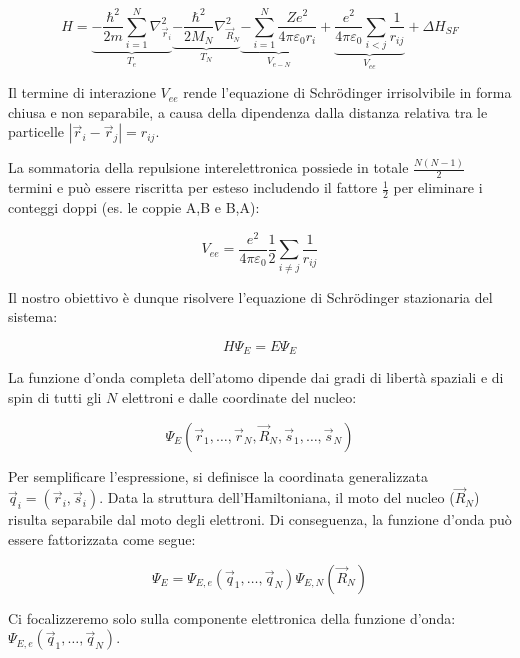 \begin{equation}
    H = \underbrace{-\frac{\hbar^2}{2m} \sum_{i=1}^{N} \nabla_{\vec{r}_i}^2}_{T_e} \underbrace{-\frac{\hbar^2}{2M_N} \nabla_{\vec{R}_N}^2}_{T_N} \underbrace{- \sum_{i=1}^{N} \frac{Z e^2}{4\pi\varepsilon_0 r_i}}_{V_{e-N}} + \underbrace{\frac{e^2}{4\pi\varepsilon_0} \sum_{i < j} \frac{1}{r_{ij}}}_{V_{ee}} + \Delta H_{SF}
\end{equation}

Il termine di interazione \( V_{ee} \) rende l'equazione di Schrödinger irrisolvibile in forma chiusa e non separabile, a causa della dipendenza dalla distanza relativa tra le particelle \( |\vec{r}_i - \vec{r}_j| = r_{ij} \). 

La sommatoria della repulsione interelettronica possiede in totale \( \frac{N(N-1)}{2} \) termini e può essere riscritta per esteso includendo il fattore \( \frac{1}{2} \) per eliminare i conteggi doppi (es. le coppie A,B e B,A):

\begin{equation}
    V_{ee} = \frac{e^2}{4\pi\varepsilon_0} \frac{1}{2} \sum_{i \neq j} \frac{1}{r_{ij}}
\end{equation}

Il nostro obiettivo è dunque risolvere l'equazione di Schrödinger stazionaria del sistema:

\begin{equation}
    H \Psi_E = E \Psi_E
\end{equation}

La funzione d'onda completa dell'atomo dipende dai gradi di libertà spaziali e di spin di tutti gli \( N \) elettroni e dalle coordinate del nucleo:

\begin{equation}
    \Psi_E(\vec{r}_1, \dots, \vec{r}_N, \vec{R}_N, \vec{s}_1, \dots, \vec{s}_N)
\end{equation}

Per semplificare l'espressione, si definisce la coordinata generalizzata \( \vec{q}_i = (\vec{r}_i, \vec{s}_i) \). Data la struttura dell'Hamiltoniana, il moto del nucleo (\( \vec{R}_N \)) risulta separabile dal moto degli elettroni. Di conseguenza, la funzione d'onda può essere fattorizzata come segue:

\begin{equation}
    \Psi_E = \Psi_{E,e}(\vec{q}_1, \dots, \vec{q}_N)\Psi_{E,N}(\vec{R}_N)
\end{equation}

Ci focalizzeremo solo sulla componente elettronica della funzione d'onda: \( \Psi_{E,e}(\vec{q}_1, \dots, \vec{q}_N) \).

